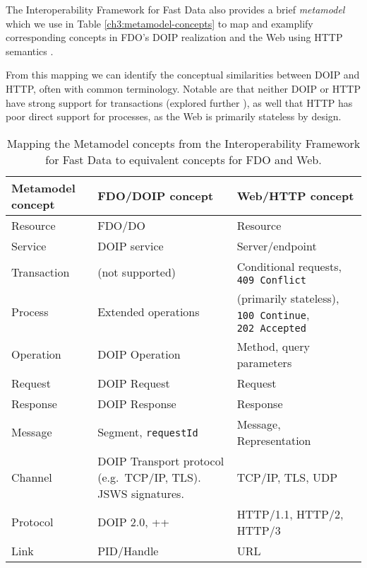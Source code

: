 The Interoperability Framework for Fast Data also provides a brief \emph{metamodel} which we use in Table \vref{ch3:metamodel-concepts} to map and examplify corresponding concepts in FDO's DOIP realization and the Web using HTTP semantics \cite{rfc9110}.

From this mapping we can identify the conceptual similarities between DOIP and HTTP, often with common terminology. Notable are that neither DOIP or HTTP have strong support for transactions (explored further ), as well that HTTP has poor direct support for processes, as the Web is primarily stateless by design.

\begin{table}[h!]
  \centering
  \caption{Mapping the Metamodel concepts from the Interoperability Framework for Fast Data \cite{delgadoInteroperabilityFrameworkDistributed2016a} to equivalent concepts for FDO and Web.
  \label{ch3:metamodel-concepts}}\tabularnewline
   \begin{tabular}{ m{5em}  m{15em} m{15em} } 
   \hline
  Metamodel concept & 
  FDO/DOIP concept & 
  Web/HTTP concept \\ 
   \hline
  Resource	  & FDO/DO	            & Resource \\
  Service	    & DOIP service	      & Server/endpoint \\
  Transaction	& (not supported)	    & Conditional requests, \texttt{409\ Conflict} \\
  Process	    & Extended operations	& (primarily stateless), \texttt{100\ Continue}, \texttt{202\ Accepted} \\
  Operation	  & DOIP Operation	    & Method, query parameters \\
  Request	    & DOIP Request	      & Request \\
  Response	  & DOIP Response	      & Response \\
  Message	    & Segment, \texttt{requestId} 
                                    & Message, Representation \\
  Channel	    & DOIP Transport protocol (e.g.~TCP/IP, TLS). JSWS signatures.
                                    & TCP/IP, TLS, UDP \\
  Protocol  	& DOIP 2.0, ++	      & HTTP/1.1, HTTP/2, HTTP/3 \\
  Link	      & PID/Handle	        & URL \\ 
   \hline
   \end{tabular}\end{table}
  


